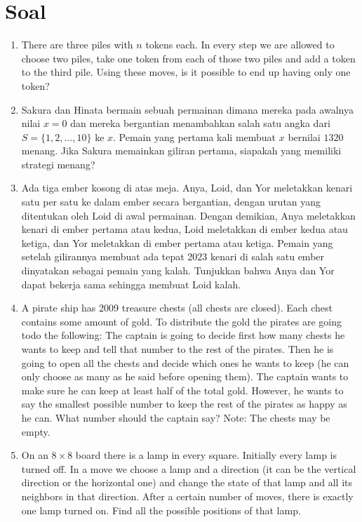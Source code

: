 \documentclass[12pt]{scrartcl}
\begin{document}
\section{Soal}
\begin{enumerate}
    \item There are three piles with $n$ tokens each. In every step we are allowed to choose two piles, take one token from each of those two piles and add a token to the third pile. Using these moves, is it possible to end up having only one token?
    
    \item Sakura dan Hinata bermain sebuah permainan dimana mereka pada awalnya nilai $x=0$ dan mereka bergantian menambahkan salah satu angka dari $S=\{1,2,\dots,10\}$ ke $x$. Pemain yang pertama kali membuat $x$ bernilai $1320$ menang. Jika Sakura memainkan giliran pertama, siapakah yang memiliki strategi menang?
    
    \item Ada tiga ember kosong di atas meja. Anya, Loid, dan Yor meletakkan kenari satu per satu ke dalam ember secara bergantian, dengan urutan yang ditentukan oleh Loid di awal permainan. Dengan demikian, Anya meletakkan kenari di ember pertama atau kedua, Loid meletakkan di ember kedua atau ketiga, dan Yor meletakkan di ember pertama atau ketiga. Pemain yang setelah gilirannya membuat ada tepat 2023 kenari di salah satu ember dinyatakan sebagai pemain yang kalah. Tunjukkan bahwa Anya dan Yor dapat bekerja sama sehingga membuat Loid kalah.
    
    \item A pirate ship has 2009 treasure chests (all chests are closed). Each chest contains some amount of gold. To distribute the gold the pirates are going todo the following: The captain is going to decide first how many chests he wants to keep and tell that number to the rest of the pirates. Then he is going to open all the chests and decide which ones he wants to keep (he can only choose as many as he said before opening them). The captain wants to make sure he can keep at least half of the total gold. However, he wants to say the smallest possible number to keep the rest of the pirates as happy as he can. What number should the captain say?
    Note: The chests may be empty.

    \item On an $8 \times 8$ board there is a lamp in every square. Initially every lamp is turned off. In a move we choose a lamp and a direction (it can be the vertical direction or the horizontal one) and change the state of that lamp and all its neighbors in that direction. After a certain number of moves, there is exactly one lamp turned on. Find all the possible positions of that lamp. %
\end{enumerate}
\end{document}
